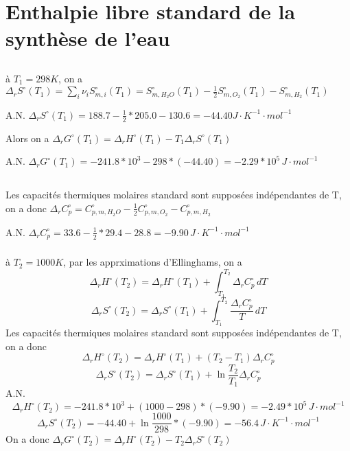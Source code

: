 \documentclass[a4paper,12pt]{book}
\begin{document}
\renewcommand{\labelitemi}{$\blacktriangleright$}
\renewcommand{\labelitemii}{$\bullet$}


\section{Enthalpie libre standard de la synthèse de l’eau}
\subsection{}
à $T_1=298K$, on a $\Delta_rS^\circ(T_1)=\sum_i\nu_iS^\circ_{m,i}(T_1)=S^\circ_{m,H_2O}(T_1)-\frac{1}{2}S^\circ_{m,O_2}(T_1)-S^\circ_{m,H_2}(T_1)$

\hspace*{\fill} 

A.N. $\Delta_rS^\circ(T_1)=188.7-\frac{1}{2}*205.0-130.6=-44.40 J\cdot K^{-1}\cdot mol^{-1}$

\hspace*{\fill} 

Alors on a $\boxed{\Delta_rG^\circ(T_1)=\Delta_rH^\circ(T_1)-T_1\Delta_rS^\circ(T_1)}$

\hspace*{\fill} 

A.N. $\boxed{\Delta_rG^\circ(T_1)=-241.8*10^3-298*(-44.40)=-2.29*10^5\,J\cdot mol^{-1}}$
    
                       
\subsection{}

Les capacités thermiques molaires standard sont supposées indépendantes de T, 
on a donc $\Delta_rC^\circ_{p}=C^\circ_{p,m,H_2O}-\frac{1}{2}C^\circ_{p,m,O_2}-C^\circ_{p,m,H_2}$

\hspace*{\fill} 

A.N. $\Delta_rC^\circ_{p}=33.6-\frac{1}{2}*29.4-28.8=-9.90\, J\cdot K^{-1} \cdot mol^{-1}$
\subsubsection{}
à $T_2=1000K$, par les apprximations d'Ellinghams, on a 
$$
\Delta_rH^\circ(T_2)=\Delta_rH^\circ(T_1)+\int^{T_2}_{T_1}\Delta_rC^\circ_p\,dT
$$
$$
\Delta_rS^\circ(T_2)=\Delta_rS^\circ(T_1)+\int^{T_2}_{T_1}\frac{\Delta_rC^\circ_p}{T}\,dT
$$
Les capacités thermiques molaires standard sont supposées indépendantes de T, on a donc 
$$
\Delta_rH^\circ(T_2)=\Delta_rH^\circ(T_1)+({T_2}-{T_1})\Delta_rC^\circ_p
$$
$$
\Delta_rS^\circ(T_2)=\Delta_rS^\circ(T_1)+\ln\frac{T_2}{T_1}\Delta_rC^\circ_p
$$
A.N. 
$$\Delta_rH^\circ(T_2)=-241.8*10^3+(1000-298)*(-9.90)=-2.49*10^5\,J\cdot mol^{-1}$$
$$\Delta_rS^\circ(T_2)=-44.40+\ln\frac{1000}{298}*(-9.90)=-56.4\,J\cdot K^{-1}\cdot mol^{-1}$$
On a donc $\boxed{\Delta_rG^\circ(T_2)=\Delta_rH^\circ(T_2)-T_2\Delta_rS^\circ(T_2)}$
\end{document}
